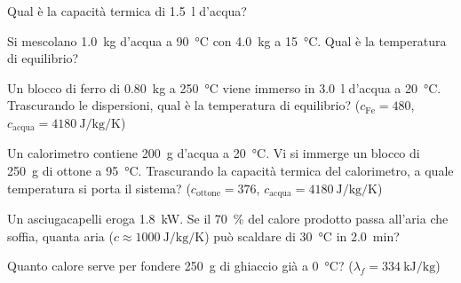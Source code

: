 \begin{esercizio}
Qual è la capacità termica di \SI{1,5}{\litre} d'acqua?\\
\end{esercizio}

\begin{esercizio}
Si mescolano \SI{1,0}{\kilogram} d'acqua a \SI{90}{\celsius} con \SI{4,0}{\kilogram} a \SI{15}{\celsius}. Qual è la temperatura di equilibrio?\\
\end{esercizio}

\begin{esercizio}
Un blocco di ferro di \SI{0,80}{\kilogram} a \SI{250}{\celsius} viene immerso in \SI{3,0}{\litre} d'acqua a \SI{20}{\celsius}. Trascurando le dispersioni, qual è la temperatura di equilibrio? ($c_{\text{Fe}} = 480$, $c_{\text{acqua}} = \SI{4180}{\joule\per\kilogram\per\kelvin}$)\\
\end{esercizio}

\begin{esercizio}
Un calorimetro contiene \SI{200}{\gram} d'acqua a \SI{20}{\celsius}. Vi si immerge un blocco di \SI{250}{\gram} di ottone a \SI{95}{\celsius}. Trascurando la capacità termica del calorimetro, a quale temperatura si porta il sistema? ($c_{\text{ottone}} = 376$, $c_{\text{acqua}} = \SI{4180}{\joule\per\kilogram\per\kelvin}$)\\
\end{esercizio}

\begin{esercizio}
Un asciugacapelli eroga \SI{1,8}{\kilo\watt}. Se il \SI{70}{\percent} del calore prodotto passa all'aria che soffia, quanta aria ($c \approx \SI{1000}{\joule\per\kilogram\per\kelvin}$) può scaldare di \SI{30}{\celsius} in \SI{2,0}{\minute}?\\
\end{esercizio}

\begin{esercizio}
Quanto calore serve per fondere \SI{250}{\gram} di ghiaccio già a \SI{0}{\celsius}? ($\lambda_f = \SI{334}{\kilo\joule\per\kilogram}$)\\
\end{esercizio}

